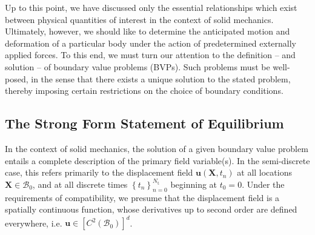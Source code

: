 Up to this point, we have discussed only the essential relationships which exist between physical quantities of interest in the context of solid mechanics. Ultimately, however, we should like to determine the anticipated motion and deformation of a particular body under the action of predetermined externally applied forces. To this end, we must turn our attention to the definition -- and solution -- of boundary value problems (BVPs). Such problems must be well-posed, in the sense that there exists a unique solution to the stated problem, thereby imposing certain restrictions on the choice of boundary conditions.

\subsection*{The Strong Form Statement of Equilibrium} \label{sec:strongform}

In the context of solid mechanics, the solution of a given boundary value problem entails a complete description of the primary field variable(s). In the semi-discrete case, this refers primarily to the displacement field $\bm{u} (\bm{X},t_n)$ at all locations $\bm{X} \in \mathcal{B}_0$, and at all discrete times $\left\{ t_n \right\}_{n=0}^{N_{\mathrm t}}$ beginning at $t_0 = 0$. Under the requirements of compatibility, we presume that the displacement field is a spatially continuous function, whose derivatives up to second order are defined everywhere, i.e. $\bm{u} \in \left[ C^2 (\mathcal{B}_0) \right]^d$.

